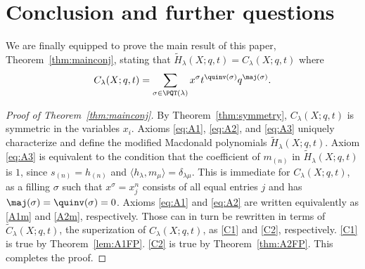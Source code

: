 \section{Conclusion and further questions}\label{sec:conclusion}

We are finally equipped to prove the main result of this paper, Theorem~\ref{thm:mainconj}, stating that $\widetilde{H}_{\lambda}(X;q,t) = C_{\lambda}(X;q,t)$ where 
\[
C_{\lambda}(X;q,t) = \sum_{\sigma\in\PQT(\lambda)}x^{\sigma}t^{\quinv(\sigma)}q^{\maj(\sigma)}.
\]

\begin{proof}[Proof of Theorem~\ref{thm:mainconj}]
By Theorem~\ref{thm:symmetry}, $C_{\lambda}(X;q,t)$ is symmetric in the variables $x_i$. Axioms \eqref{eq:A1}, \eqref{eq:A2}, and \eqref{eq:A3} uniquely characterize and define the modified Macdonald polynomials $\widetilde{H}_{\lambda}(X;q,t)$. Axiom \eqref{eq:A3} is equivalent to the condition that the coefficient of $m_{(n)}$ in $\widetilde{H}_{\lambda}(X;q,t)$ is $1$, since $s_{(n)}=h_{(n)}$ and $\langle h_{\lambda},m_{\mu}\rangle=\delta_{\lambda\mu}$. This is immediate for $C_{\lambda}(X;q,t)$, as a filling $\sigma$ such that $x^{\sigma}=x_j^n$ consists of all equal entries $j$ and has $\maj(\sigma)=\quinv(\sigma)=0$. Axioms \eqref{eq:A1} and \eqref{eq:A2} are written equivalently as \eqref{A1m} and \eqref{A2m}, respectively. 
Those can in turn be rewritten in terms of $\widetilde{C}_{\lambda}(X;q,t)$, the superization of $C_{\lambda}(X;q,t)$, as \eqref{C1} and \eqref{C2}, respectively. \eqref{C1} is true by Theorem~\ref{lem:A1FP}. \eqref{C2} is true by Theorem~\ref{thm:A2FP}. This completes the proof. 
\end{proof}
